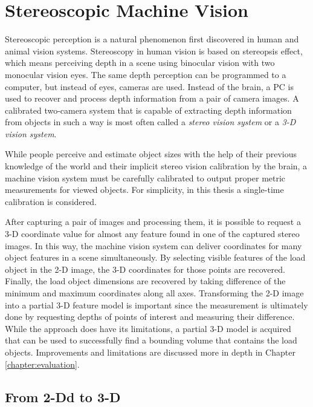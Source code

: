 \documentclass[12pt,a4paper,oneside,pdftex]{report}
\begin{document}
    

\chapter{Stereoscopic Machine Vision}
\label{chapter:stereoscopic_machine_vision}
Stereoscopic perception is a natural phenomenon first discovered in human and animal vision systems. Stereoscopy in human vision is based on stereopsis effect, which means perceiving depth in a scene using binocular vision with two monocular vision eyes. The same depth perception can be programmed to a computer, but instead of eyes, cameras are used. Instead of the brain, a PC is used to recover and process depth information from a pair of camera images. A calibrated two-camera system that is capable of extracting depth information from objects in such a way is most often called a \emph{stereo vision system} or a \emph{3-D vision system}.

While people perceive and estimate object sizes with the help of their previous knowledge of the world and their implicit stereo vision calibration by the brain, a machine vision system must be carefully calibrated to output proper metric measurements for viewed objects. For simplicity, in this thesis a single-time calibration is considered.

After capturing a pair of images and processing them, it is possible to request a 3-D coordinate value for almost any feature found in one of the captured stereo images. In this way, the machine vision system can deliver coordinates for many object features in a scene simultaneously. By selecting visible features of the load object in the 2-D image, the 3-D coordinates for those points are recovered. Finally, the load object dimensions are recovered by taking difference of the minimum and maximum coordinates along all axes. Transforming the 2-D image into a partial 3-D feature model is important since the measurement is ultimately done by requesting depths of points of interest and measuring their difference. While the approach does have its limitations, a partial 3-D model is acquired that can be used to successfully find a bounding volume that contains the load objects. Improvements and limitations are discussed more in depth in Chapter \ref{chapter:evaluation}.

\section{From 2-Dd to 3-D}
\label{section:from_2d_to_3d}
\end{document}
